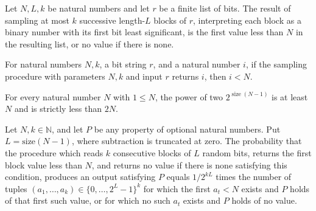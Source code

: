 \begin{theorem}
\label{Randomized.sampleTries_eq_find}
\leanok
{}
Let $N,L,k$ be natural numbers and let $r$ be a finite list of bits. The result of
sampling at most $k$ successive length-$L$ blocks of $r$, interpreting each block as a
binary number with its first bit least significant, is the first value less than $N$ in
the resulting list, or no value if there is none.
\end{theorem}

\begin{theorem}
\label{Randomized.lt_of_uniformSample_eq_some}
\leanok
{}
For natural numbers $N,k$, a bit string $r$, and a natural number $i$, if the sampling
procedure with parameters $N,k$ and input $r$ returns $i$, then $i<N$.
\end{theorem}

\begin{theorem}
\label{Randomized.le_two_pow_size_pred}
\leanok
{}
For every natural number $N$ with $1\leq N$, the power of two
$2^{\operatorname{size}(N-1)}$ is at least $N$ and is strictly less than $2N$.
\end{theorem}

\begin{theorem}
\label{Randomized.randProb_uniformSample}
\leanok
{}
Let $N,k\in\mathbb{N}$, and let $P$ be any property of optional natural numbers. Put
$L=\mathrm{size}(N-1)$, where subtraction is truncated at zero. The probability that the
procedure which reads $k$ consecutive blocks of $L$ random bits, returns the first block
value less than $N$, and returns no value if there is none satisfying this condition,
produces an output satisfying $P$ equals $1/2^{kL}$ times the number of tuples
$(a_1,\ldots,a_k)\in\{0,\ldots,2^L-1\}^k$ for which the first $a_t<N$ exists and $P$
holds of that first such value, or for which no such $a_t$ exists and $P$ holds of no
value.
\end{theorem}

